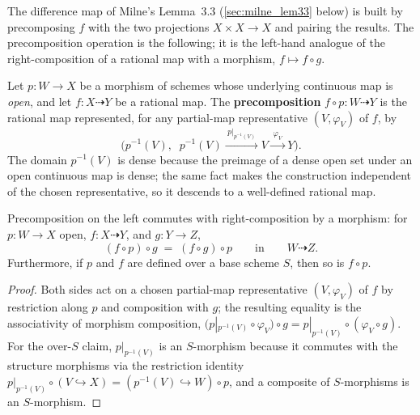 The difference map of Milne's Lemma~3.3 (\cref{sec:milne_lem33} below) is built by
precomposing \(f\) with the two projections \(X \times X \to X\) and pairing the results.
The precomposition operation is the following; it is the left-hand analogue of the
right-composition of a rational map with a morphism, \(f \mapsto f \circ g\).

\begin{definition}\leanok
  \label{def:rationalMap_precomp}
  Let \(p \colon W \to X\) be a morphism of schemes whose underlying continuous map is
  \emph{open}, and let \(f \colon X \dashrightarrow Y\) be a rational map. The
  \textbf{precomposition} \(f \circ p \colon W \dashrightarrow Y\) is the rational map
  represented, for any partial-map representative \((V, \varphi_V)\) of \(f\), by
  \[
    \bigl(p^{-1}(V),\; \; p^{-1}(V) \xrightarrow{\;p|_{p^{-1}(V)}\;} V
    \xrightarrow{\;\varphi_V\;} Y\bigr).
  \]
  The domain \(p^{-1}(V)\) is dense because the preimage of a dense open set under an open
  continuous map is dense; the same fact makes the construction independent of the chosen
  representative, so it descends to a well-defined rational map.
\end{definition}

\begin{lemma}\leanok
  \label{lem:rationalMap_precomp_compHom}
  Precomposition on the left commutes with right-composition by a morphism: for
  \(p \colon W \to X\) open, \(f \colon X \dashrightarrow Y\), and \(g \colon Y \to Z\),
  \[
    (f \circ p) \circ g \;=\; (f \circ g) \circ p
    \qquad\text{in}\qquad W \dashrightarrow Z .
  \]
  Furthermore, if \(p\) and \(f\) are defined over a base scheme \(S\), then so is
  \(f \circ p\).
\end{lemma}
\begin{proof}\leanok
  Both sides act on a chosen partial-map representative \((V, \varphi_V)\) of \(f\) by
  restriction along \(p\) and composition with \(g\); the resulting equality is the
  associativity of morphism composition,
  \((p|_{p^{-1}(V)} \circ \varphi_V) \circ g = p|_{p^{-1}(V)} \circ (\varphi_V \circ g)\).
  For the over-\(S\) claim, \(p|_{p^{-1}(V)}\) is an \(S\)-morphism because it commutes with
  the structure morphisms via the restriction identity
  \(p|_{p^{-1}(V)} \circ (V \hookrightarrow X) = (p^{-1}(V) \hookrightarrow W) \circ p\),
  and a composite of \(S\)-morphisms is an \(S\)-morphism.
\end{proof}

